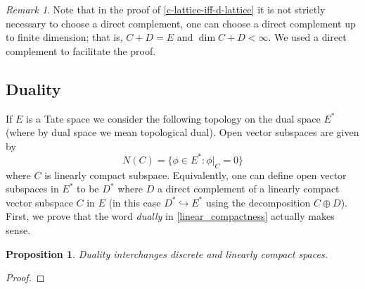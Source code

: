 \documentclass{book}[12pt]
\theoremstyle{definition}
\theoremstyle{plain}
\newtheorem{proposition}[definition]{Proposition}
\theoremstyle{remark}
\newtheorem{remark}[definition]{Remark}
\begin{document}
 	\begin{remark}\label{up-to-finite-dimension}
 		Note that in the proof of \cref{c-lattice-iff-d-lattice} it is not strictly necessary to choose a direct complement, one can choose a direct complement up to finite dimension; that is, $C + D = E$ and $\dim C + D < \infty$. We used a direct complement to facilitate the proof.
 	\end{remark}
 	\subsection*{Duality}
 	If $E$ is a Tate space we consider the following topology on the dual space $E^{*}$ (where by dual space we mean topological dual). Open vector subspaces are given by
 	\[
 		N(C) = \{\phi\in E^{*} \colon \phi\lvert_{C} = 0\}
 	\]
 	where $C$ is linearly compact subspace. Equivalently, one can define open vector subspaces in $E^{*}$ to be $D^{*}$ where $D$ a direct complement of a linearly compact vector subspace $C$ in $E$ (in this case $D^{*} \hookrightarrow E^{*}$ using the decomposition $C\oplus D$).  \\

 	First, we prove that the word \emph{dually} in \cref{linear_compactness} actually makes sense. 

 	\begin{proposition}\label{duality-d-lattice-c-lattice}
 		Duality interchanges discrete and linearly compact spaces.
 	\end{proposition}
 	\begin{proof}
 		
 	\end{proof}
 	
 	
 	
 	
 	
\end{document}
